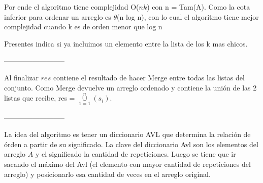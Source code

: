 Por ende el algoritmo tiene complejidad O($nk$) con n = Tam(A). Como la cota inferior para ordenar un arreglo
es $\theta$(n log n), con lo cual el algoritmo tiene mejor complejidad cuando k es de orden menor que log n

Presentes indica si ya incluimos un elemento entre la lista de los k mas chicos.

--------------------------


Al finalizar $res$ contiene el resultado de hacer Merge entre todas las listas del conjunto. Como Merge devuelve un arreglo ordenado y contiene la unión de las 2 listas que recibe, res = $\cup\limits_{1=1}^{n}(s_i)$.

--------------------------


La idea del algoritmo es tener un diccionario AVL que determina la relación de órden a partir de su significado. La clave del diccionario Avl son los elementos del arreglo $A$ y el significado la cantidad 
de repeticiones. Luego se tiene que ir sacando el máximo del Avl (el elemento con mayor cantidad de repeticiones del arreglo) y posicionarlo esa cantidad de veces en el arreglo original.

